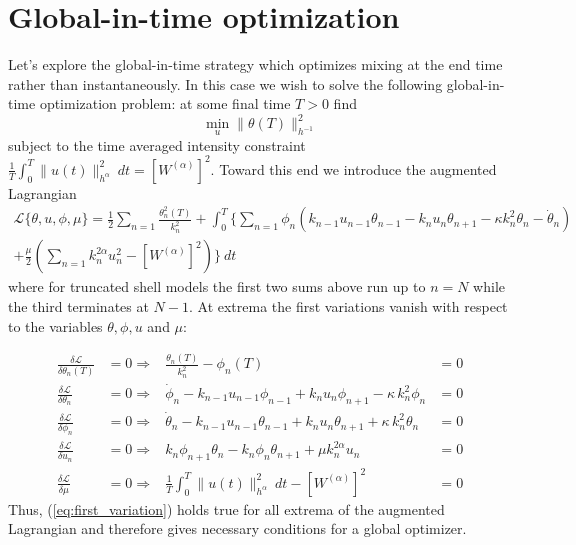 \section{Global-in-time optimization}
\label{sec:GIT}
Let's explore the global-in-time strategy which optimizes mixing at the end time rather than instantaneously. In this case we wish to solve the following global-in-time optimization problem: at some final time $T > 0$ find
\begin{equation}
	\label{eq:shellNN_git_probM}
	\min_{u}  \| \theta (T) \|^{2}_{h^{-1}} 
\end{equation}
subject to the time averaged intensity constraint
$
\frac{1}{T}\int_{0}^{T}\| u (t) \|^{2}_{h^{\alpha}}\: dt = [W^{(\alpha)}]^2.
$
Toward this end we introduce the augmented Lagrangian
\begin{multline*}
	\mathcal{ L} \{ \theta, u,\phi,\mu \} = \frac{1}{2} \sum_{n=1}^{}\frac{\theta_{n}^{2}(T)}{k_{n}^2} + \int_{0}^{T}\Bigg \{\sum_{n=1}^{}\phi_{n}\left(k_{n-1}u_{n-1}\theta_{n-1}-k_{n}u_{n} \theta_{n+1}- \kappa k_n^2 \theta_n -\dot{\theta}_{n}\right) \\
	+  \frac{\mu }{2}\left( \sum_{n=1}^{}k_{n}^{2\alpha}u_{n}^{2} - [W^{(\alpha)}]^2\right)  \Bigg\}\: dt
\end{multline*}
where for truncated shell models the first two sums above run up to $n=N$ while the third terminates at $N-1$. At extrema the first variations vanish with respect to the variables $\theta, \phi, u$ and $\mu$:

\begin{subequations}
	\label{eq:first_variation}
	\begin{align}
		\frac{\delta \mathcal{L}}{\delta \theta_{n}(T)}&=0  \Rightarrow & \frac{\theta_{n}(T)}{k_{n}^2}-\phi_{n}(T)&=0
		\label{eq:first_variation_terminal} \\
		\frac{\delta \mathcal{L}}{\delta \theta_{n}}&=0  \Rightarrow  & \dot{\phi}_{n}- k_{n-1}u_{n-1}\phi_{n-1} + k_{n}u_{n} \phi_{n+1} - \kappa \, k_n^2\phi_n &=0
		\label{eq:first_variation_adjoint} \\
		\frac{\delta \mathcal{L}}{\delta \phi_{n}}&=0  \Rightarrow  & \dot{\theta}_{n}- k_{n-1}u_{n-1}\theta_{n-1} + k_{n}u_{n} \theta_{n+1} + \kappa \, k_n^2\theta_n &=0
		\label{eq:first_variation_state} \\
		\frac{\delta \mathcal{L}}{\delta u_{n}}&=0 \Rightarrow  &  k_{n}\phi_{n+1}\theta_{n} - k_{n}\phi_{n}\theta_{n+1}+\mu k_{n}^{2\alpha}u_{n} &=0
		\label{eq:first_variation_optimality} \\
		\frac{\delta \mathcal{L}}{\delta \mu}&=0 \Rightarrow &
		\frac{1}{T}\int_{0}^{T}\| u (t) \|^{2}_{h^{\alpha}}\: dt - [W^{(\alpha)}]^2 &= 0
		\label{eq:first_variation_constraint}
	\end{align}
\end{subequations}
Thus, (\ref{eq:first_variation}) holds true for all extrema of the augmented Lagrangian and therefore gives necessary conditions for a global optimizer. 


